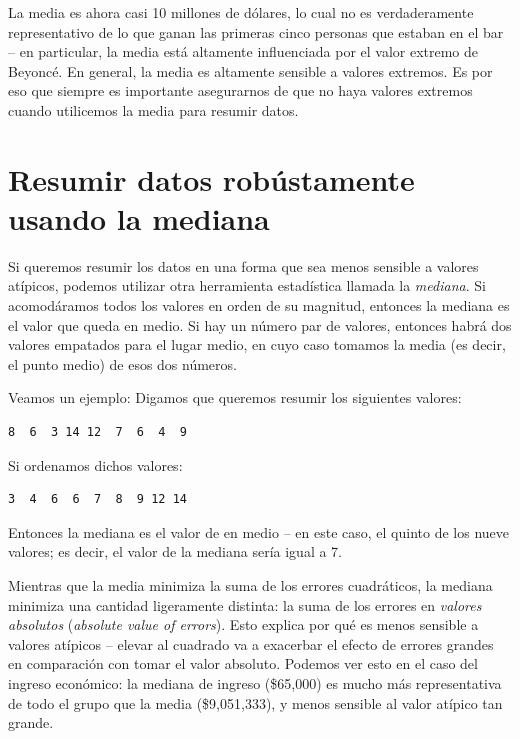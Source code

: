 \documentclass[
  12pt,
]{book}
\begin{document}
La media es ahora casi 10 millones de dólares, lo cual no es verdaderamente representativo de lo que ganan las primeras cinco personas que estaban en el bar -- en particular, la media está altamente influenciada por el valor extremo de Beyoncé. En general, la media es altamente sensible a valores extremos. Es por eso que siempre es importante asegurarnos de que no haya valores extremos cuando utilicemos la media para resumir datos.

\hypertarget{resumir-datos-robuxfastamente-usando-la-mediana}{%
\section{Resumir datos robústamente usando la mediana}\label{resumir-datos-robuxfastamente-usando-la-mediana}}

Si queremos resumir los datos en una forma que sea menos sensible a valores atípicos, podemos utilizar otra herramienta estadística llamada la \emph{mediana}. Si acomodáramos todos los valores en orden de su magnitud, entonces la mediana es el valor que queda en medio. Si hay un número par de valores, entonces habrá dos valores empatados para el lugar medio, en cuyo caso tomamos la media (es decir, el punto medio) de esos dos números.

Veamos un ejemplo: Digamos que queremos resumir los siguientes valores:

\begin{verbatim}
8  6  3 14 12  7  6  4  9
\end{verbatim}

Si ordenamos dichos valores:

\begin{verbatim}
3  4  6  6  7  8  9 12 14
\end{verbatim}

Entonces la mediana es el valor de en medio -- en este caso, el quinto de los nueve valores; es decir, el valor de la mediana sería igual a 7.

Mientras que la media minimiza la suma de los errores cuadráticos, la mediana minimiza una cantidad ligeramente distinta: la suma de los errores en \emph{valores absolutos} (\emph{absolute value of errors}). Esto explica por qué es menos sensible a valores atípicos -- elevar al cuadrado va a exacerbar el efecto de errores grandes en comparación con tomar el valor absoluto. Podemos ver esto en el caso del ingreso económico: la mediana de ingreso (\$65,000) es mucho más representativa de todo el grupo que la media (\$9,051,333), y menos sensible al valor atípico tan grande.
\end{document}
